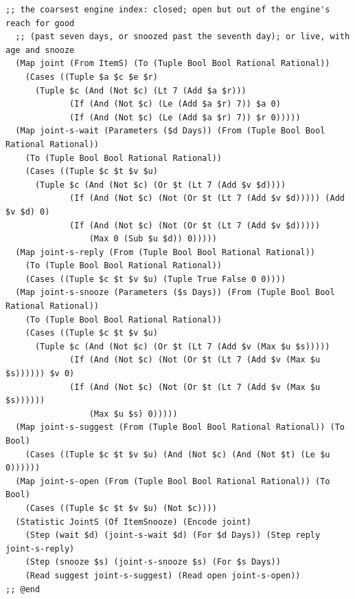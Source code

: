 \documentclass[11pt]{article}
\theoremstyle{definition}
\theoremstyle{plain}
\begin{document}
\begin{lstlisting}[style=mettafull]
  ;; the coarsest engine index: closed; open but out of the engine's reach for good
  ;; (past seven days, or snoozed past the seventh day); or live, with age and snooze
  (Map joint (From ItemS) (To (Tuple Bool Bool Rational Rational))
    (Cases ((Tuple $a $c $e $r)
      (Tuple $c (And (Not $c) (Lt 7 (Add $a $r)))
             (If (And (Not $c) (Le (Add $a $r) 7)) $a 0)
             (If (And (Not $c) (Le (Add $a $r) 7)) $r 0)))))
  (Map joint-s-wait (Parameters ($d Days)) (From (Tuple Bool Bool Rational Rational))
    (To (Tuple Bool Bool Rational Rational))
    (Cases ((Tuple $c $t $v $u)
      (Tuple $c (And (Not $c) (Or $t (Lt 7 (Add $v $d))))
             (If (And (Not $c) (Not (Or $t (Lt 7 (Add $v $d))))) (Add $v $d) 0)
             (If (And (Not $c) (Not (Or $t (Lt 7 (Add $v $d)))))
                 (Max 0 (Sub $u $d)) 0)))))
  (Map joint-s-reply (From (Tuple Bool Bool Rational Rational))
    (To (Tuple Bool Bool Rational Rational))
    (Cases ((Tuple $c $t $v $u) (Tuple True False 0 0))))
  (Map joint-s-snooze (Parameters ($s Days)) (From (Tuple Bool Bool Rational Rational))
    (To (Tuple Bool Bool Rational Rational))
    (Cases ((Tuple $c $t $v $u)
      (Tuple $c (And (Not $c) (Or $t (Lt 7 (Add $v (Max $u $s)))))
             (If (And (Not $c) (Not (Or $t (Lt 7 (Add $v (Max $u $s)))))) $v 0)
             (If (And (Not $c) (Not (Or $t (Lt 7 (Add $v (Max $u $s))))))
                 (Max $u $s) 0)))))
  (Map joint-s-suggest (From (Tuple Bool Bool Rational Rational)) (To Bool)
    (Cases ((Tuple $c $t $v $u) (And (Not $c) (And (Not $t) (Le $u 0))))))
  (Map joint-s-open (From (Tuple Bool Bool Rational Rational)) (To Bool)
    (Cases ((Tuple $c $t $v $u) (Not $c))))
  (Statistic JointS (Of ItemSnooze) (Encode joint)
    (Step (wait $d) (joint-s-wait $d) (For $d Days)) (Step reply joint-s-reply)
    (Step (snooze $s) (joint-s-snooze $s) (For $s Days))
    (Read suggest joint-s-suggest) (Read open joint-s-open))
;; @end


\end{lstlisting}
\end{document}
